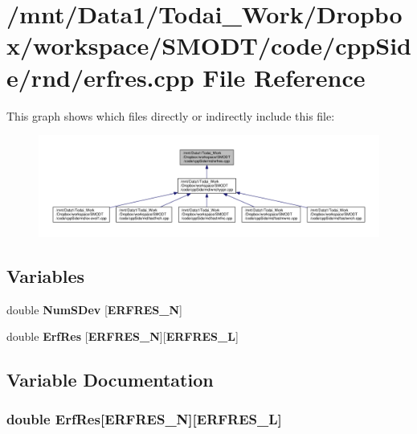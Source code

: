\section{/mnt/\-Data1/\-Todai\-\_\-\-Work/\-Dropbox/workspace/\-S\-M\-O\-D\-T/code/cpp\-Side/rnd/erfres.cpp File Reference}
\label{rnd_2erfres_8cpp}
This graph shows which files directly or indirectly include this file\-:\nopagebreak
\begin{figure}[H]
\begin{center}
\leavevmode
\includegraphics[width=350pt]{rnd_2erfres_8cpp__dep__incl}
\end{center}
\end{figure}
\subsection*{Variables}
\begin{DoxyCompactItemize}
\item 
double {\bf Num\-S\-Dev} [{\bf E\-R\-F\-R\-E\-S\-\_\-\-N}]
\item 
double {\bf Erf\-Res} [{\bf E\-R\-F\-R\-E\-S\-\_\-\-N}][{\bf E\-R\-F\-R\-E\-S\-\_\-\-L}]
\end{DoxyCompactItemize}


\subsection{Variable Documentation}
\subsubsection[{Erf\-Res}]{\setlength{\rightskip}{0pt plus 5cm}double Erf\-Res[{\bf E\-R\-F\-R\-E\-S\-\_\-\-N}][{\bf E\-R\-F\-R\-E\-S\-\_\-\-L}]}\label{rnd_2erfres_8cpp_a532e3be570cd6f91d0e35bf278570579}


